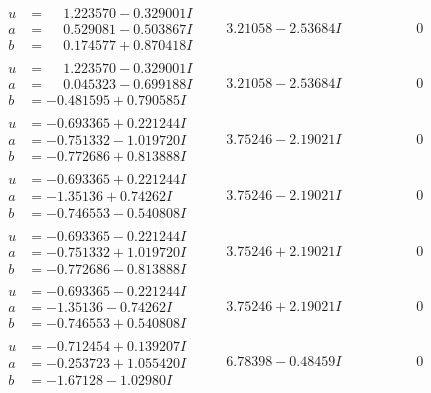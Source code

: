 \documentclass[1p]{elsarticle_modified}
\theoremstyle{definition}
\begin{document}
$$\begin{array}{c|c|c}
\begin{aligned}
u &= \phantom{-}1.223570 - 0.329001 I \\
a &= \phantom{-}0.529081 - 0.503867 I \\
b &= \phantom{-}0.174577 + 0.870418 I\end{aligned}
 & \phantom{-}3.21058 - 2.53684 I & \phantom{-0.000000 } 0 \\ \hline\begin{aligned}
u &= \phantom{-}1.223570 - 0.329001 I \\
a &= \phantom{-}0.045323 - 0.699188 I \\
b &= -0.481595 + 0.790585 I\end{aligned}
 & \phantom{-}3.21058 - 2.53684 I & \phantom{-0.000000 } 0 \\ \hline\begin{aligned}
u &= -0.693365 + 0.221244 I \\
a &= -0.751332 - 1.019720 I \\
b &= -0.772686 + 0.813888 I\end{aligned}
 & \phantom{-}3.75246 - 2.19021 I & \phantom{-0.000000 } 0 \\ \hline\begin{aligned}
u &= -0.693365 + 0.221244 I \\
a &= -1.35136 + 0.74262 I \\
b &= -0.746553 - 0.540808 I\end{aligned}
 & \phantom{-}3.75246 - 2.19021 I & \phantom{-0.000000 } 0 \\ \hline\begin{aligned}
u &= -0.693365 - 0.221244 I \\
a &= -0.751332 + 1.019720 I \\
b &= -0.772686 - 0.813888 I\end{aligned}
 & \phantom{-}3.75246 + 2.19021 I & \phantom{-0.000000 } 0 \\ \hline\begin{aligned}
u &= -0.693365 - 0.221244 I \\
a &= -1.35136 - 0.74262 I \\
b &= -0.746553 + 0.540808 I\end{aligned}
 & \phantom{-}3.75246 + 2.19021 I & \phantom{-0.000000 } 0 \\ \hline\begin{aligned}
u &= -0.712454 + 0.139207 I \\
a &= -0.253723 + 1.055420 I \\
b &= -1.67128 - 1.02980 I\end{aligned}
 & \phantom{-}6.78398 - 0.48459 I & \phantom{-0.000000 } 0 \\ \hline\begin{aligned}

\end{aligned}
\end{array}$$
\end{document}
